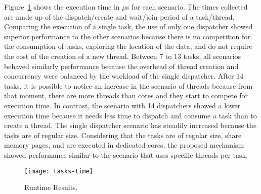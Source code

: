 	Figure~\ref{fig:time} shows the execution time in $\mu$s for each scenario.
	The times collected are made up of the dispatch/create and wait/join period
	of a task/thread.  Comparing the execution of a single task, the use of
	only one dispatcher showed superior performance to the other scenarios
	because there is no competition for the consumption of tasks, exploring the
	location of the data, and do not require the cost of the creation of a new
	thread. Between	7 to 13 tasks, all scenarios behaved similarly performance
	because the overhead of thread creation and concurrency were balanced by
	the workload of the single dispatcher. After 14 tasks, it is possible to
	notice an increase in the scenario of threads because from that moment,
	there are more threads than cores and they start to compete for execution
	time. In contrast, the scenario with 14 dispatchers showed a lower
	execution time because it needs less time to dispatch and consume a task
	than to create a thread. The single dispatcher scenario has steadily
	increased because the tasks are of regular size. Considering that the tasks
	are of regular size, share memory pages, and are executed in dedicated
	cores, the proposed mechanism showed performance similar to the scenario
	that uses specific threads per task.

	\begin{figure}[t]
			\centering
			\texttt{[image: tasks-time]}
			\caption{Runtime Results.}
			\label{fig:time}
	\end{figure}
